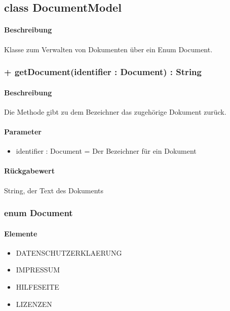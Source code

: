 \subsection{class DocumentModel}
\paragraph*{Beschreibung}
Klasse zum Verwalten von Dokumenten über ein Enum Document.

\subsubsection{+ getDocument(identifier : Document) : String}%
\paragraph*{Beschreibung}
Die Methode gibt zu dem Bezeichner das zugehörige Dokument zurück.
\paragraph*{Parameter}
\begin{itemize}
    \item identifier : Document = Der Bezeichner für ein Dokument
\end{itemize}
\paragraph*{Rückgabewert}
String, der Text des Dokuments


\subsubsection{enum Document}
\paragraph*{Elemente}
\begin{itemize}
    \item DATENSCHUTZERKLAERUNG
    \item IMPRESSUM
    \item HILFESEITE
    \item LIZENZEN
\end{itemize}